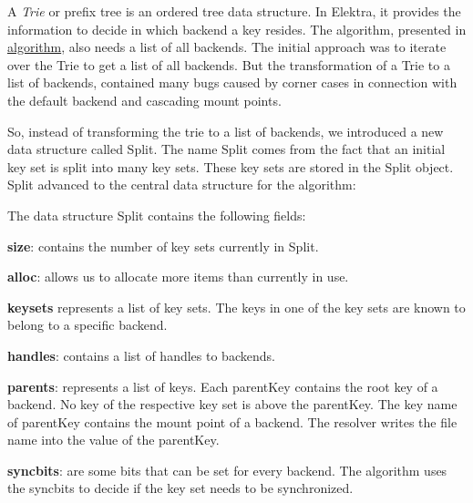 A {\itshape Trie} or prefix tree is an ordered tree data structure. In Elektra, it provides the information to decide in which backend a key resides. The algorithm, presented in \mbox{\hyperlink{doc_dev_algorithm_md}{algorithm}}, also needs a list of all backends. The initial approach was to iterate over the {\ttfamily Trie} to get a list of all backends. But the transformation of a {\ttfamily Trie} to a list of backends, contained many bugs caused by corner cases in connection with the default backend and cascading mount points.

So, instead of transforming the trie to a list of backends, we introduced a new data structure called {\ttfamily Split}. The name {\ttfamily Split} comes from the fact that an initial key set is split into many key sets. These key sets are stored in the {\ttfamily Split} object. {\ttfamily Split} advanced to the central data structure for the algorithm\+:


\begin{DoxyCode}{0}
\DoxyCodeLine{}
\DoxyCodeLine{\};}
\end{DoxyCode}


The data structure {\ttfamily Split} contains the following fields\+:


\begin{DoxyItemize}
\item {\bfseries{size}}\+: contains the number of key sets currently in {\ttfamily Split}.
\item {\bfseries{alloc}}\+: allows us to allocate more items than currently in use.
\item {\bfseries{keysets}} represents a list of key sets. The keys in one of the key sets are known to belong to a specific backend.
\item {\bfseries{handles}}\+: contains a list of handles to backends.
\item {\bfseries{parents}}\+: represents a list of keys. Each {\ttfamily parent\+Key} contains the root key of a backend. No key of the respective key set is above the {\ttfamily parent\+Key}. The key name of {\ttfamily parent\+Key} contains the mount point of a backend. The resolver writes the file name into the value of the {\ttfamily parent\+Key}.
\item {\bfseries{syncbits}}\+: are some bits that can be set for every backend. The algorithm uses the {\ttfamily syncbits} to decide if the key set needs to be synchronized.
\end{DoxyItemize}

